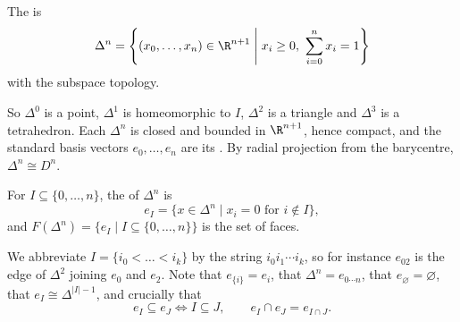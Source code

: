 \begin{definition}[Simplex]
	The  is
	$$
	\Delta^n = \left\{(x_0,\dots,x_n) \in \R^{n+1} \;\middle|\; x_i \geq 0, \ \sum_{i=0}^n x_i = 1\right\}
	$$
	with the subspace topology.
\end{definition}

So $\Delta^0$ is a point, $\Delta^1$ is homeomorphic to $I$, $\Delta^2$ is a triangle and
$\Delta^3$ is a tetrahedron. Each $\Delta^n$ is closed and bounded in $\R^{n+1}$, hence
compact, and the standard basis vectors $e_0,\dots,e_n$ are its . By
radial projection from the barycentre, $\Delta^n \cong D^n$.

\begin{center}
\end{center}

\begin{definition}[Face]
	For $I \subseteq \{0,\dots,n\}$, the  of $\Delta^n$ is
	$$
	e_I = \{x \in \Delta^n \mid x_i = 0 \text{ for } i \notin I\},
	$$
	and $F(\Delta^n) = \{e_I \mid I \subseteq \{0,\dots,n\}\}$ is the set of faces.
\end{definition}

We abbreviate $I = \{i_0 < \dots < i_k\}$ by the string $i_0i_1\cdots i_k$, so for instance
$e_{02}$ is the edge of $\Delta^2$ joining $e_0$ and $e_2$. Note that
$e_{\{i\}} = e_i$, that $\Delta^n = e_{0\cdots n}$, that $e_\varnothing = \varnothing$,
that $e_I \cong \Delta^{|I|-1}$, and crucially that
$$
e_I \subseteq e_J \iff I \subseteq J, \qquad e_I \cap e_J = e_{I \cap J}.
$$

